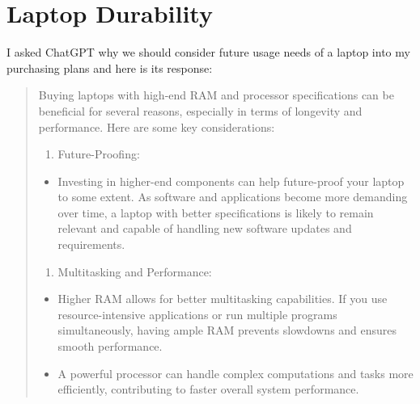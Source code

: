 \documentclass[14pt,letterpaper,twoside]{extreport}
\renewenvironment{leftbar}[1][\hsize]
{%
    \def\FrameCommand{%
        {\color{gray!25}\vrule width 10pt}%
        \hspace{0pt}
        \fboxsep=\FrameSep\colorbox{gray!5}%
    }%
    \MakeFramed{\hsize#1\advance\hsize-\width\FrameRestore}%
}
{\endMakeFramed}
\begin{document}
\hypertarget{future-proofing}{}\section{Laptop Durability}\label{future-proofing}

I asked ChatGPT why we should consider future usage needs of a laptop into my purchasing plans and here is its response:

\begin{leftbar} \begin{quote}
		Buying laptops with high-end RAM and processor specifications can be beneficial for several reasons, especially in terms of longevity and performance. Here are some key considerations:

		\begin{enumerate}[leftmargin=*]
			\def\labelenumi{\arabic{enumi}.}

			\item
			      Future-Proofing:
		\end{enumerate}

		\begin{itemize}

			\item
			      Investing in higher-end components can help future-proof your laptop to some extent. As software and applications become more demanding over time, a laptop with better specifications is likely to remain relevant and capable of handling new software updates and requirements.
		\end{itemize}

		\begin{enumerate}[leftmargin=*]
			\def\labelenumi{\arabic{enumi}.}
			\setcounter{enumi}{1}

			\item
			      Multitasking and Performance:
		\end{enumerate}

		\begin{itemize}

			\item
			      Higher RAM allows for better multitasking capabilities. If you use resource-intensive applications or run multiple programs simultaneously, having ample RAM prevents slowdowns and ensures smooth performance.
			\item
			      A powerful processor can handle complex computations and tasks more efficiently, contributing to faster overall system performance.
		\end{itemize}


\end{quote}
\end{leftbar}
\end{document}
